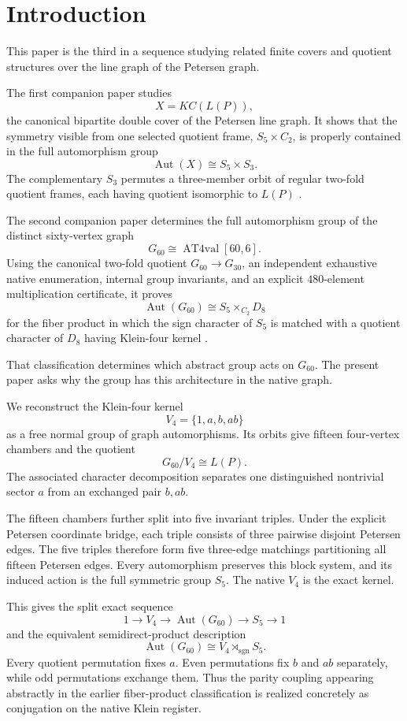 \section{Introduction}

This paper is the third in a sequence studying related finite covers
and quotient structures over the line graph of the Petersen graph.

The first companion paper studies
\[
X=KC(L(P)),
\]
the canonical bipartite double cover of the Petersen line graph. It
shows that the symmetry visible from one selected quotient frame,
\(S_5\times C_2\), is properly contained in the full automorphism
group
\[
\operatorname{Aut}(X)\cong S_5\times S_3.
\]
The complementary \(S_3\) permutes a three-member orbit of regular
two-fold quotient frames, each having quotient isomorphic to
\(L(P)\) \cite{CaveCanonicalBipartite2026}.

The second companion paper determines the full automorphism group of
the distinct sixty-vertex graph
\[
G_{60}\cong \operatorname{AT4val}[60,6].
\]
Using the canonical two-fold quotient \(G_{60}\to G_{30}\), an
independent exhaustive native enumeration, internal group invariants,
and an explicit \(480\)-element multiplication certificate, it proves
\[
\operatorname{Aut}(G_{60})
\cong S_5\times_{C_2}D_8
\]
for the fiber product in which the sign character of \(S_5\) is
matched with a quotient character of \(D_8\) having Klein-four kernel
\cite{CaveAT4Automorphism2026}.

That classification determines which abstract group acts on
\(G_{60}\). The present paper asks why the group has this architecture
in the native graph.

We reconstruct the Klein-four kernel
\[
V_4=\{1,a,b,ab\}
\]
as a free normal group of graph automorphisms. Its orbits give fifteen
four-vertex chambers and the quotient
\[
G_{60}/V_4\cong L(P).
\]
The associated character decomposition separates one distinguished
nontrivial sector \(a\) from an exchanged pair \(b,ab\).

The fifteen chambers further split into five invariant triples. Under
the explicit Petersen coordinate bridge, each triple consists of
three pairwise disjoint Petersen edges. The five triples therefore
form five three-edge matchings partitioning all fifteen Petersen
edges. Every automorphism preserves this block system, and its induced
action is the full symmetric group \(S_5\). The native \(V_4\) is the
exact kernel.

This gives the split exact sequence
\[
1\longrightarrow V_4
\longrightarrow \operatorname{Aut}(G_{60})
\longrightarrow S_5
\longrightarrow 1
\]
and the equivalent semidirect-product description
\[
\operatorname{Aut}(G_{60})
\cong V_4\rtimes_{\operatorname{sgn}}S_5.
\]
Every quotient permutation fixes \(a\). Even permutations fix \(b\)
and \(ab\) separately, while odd permutations exchange them. Thus the
parity coupling appearing abstractly in the earlier fiber-product
classification is realized concretely as conjugation on the native
Klein register.

